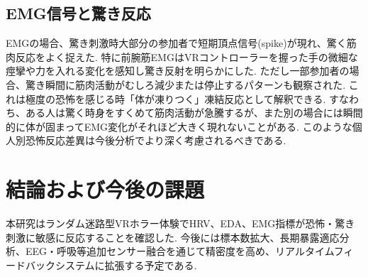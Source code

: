\documentclass[a4paper]{jarticle}
\begin{document}
\subsection{EMG信号と驚き反応}

EMGの場合、驚き刺激時大部分の参加者で短期頂点信号(spike)が現れ、驚く筋肉反応をよく捉えた. 特に前腕筋EMGはVRコントローラーを握った手の微細な痙攣や力を入れる変化を感知し驚き反射を明らかにした. ただし一部参加者の場合、驚き瞬間に筋肉活動がむしろ減少または停止するパターンも観察された. これは極度の恐怖を感じる時「体が凍りつく」凍結反応として解釈できる. すなわち、ある人は驚く時身をすくめて筋肉活動が急騰するが、また別の場合には瞬間的に体が固まってEMG変化がそれほど大きく現れないことがある. このような個人別恐怖反応差異は今後分析でより深く考慮されるべきである.

\section{結論および今後の課題}%

本研究はランダム迷路型VRホラー体験でHRV、EDA、EMG指標が恐怖・驚き刺激に敏感に反応することを確認した. 今後には標本数拡大、長期暴露適応分析、EEG・呼吸等追加センサー融合を通じて精密度を高め、リアルタイムフィードバックシステムに拡張する予定である.


\balance

\end{document}
